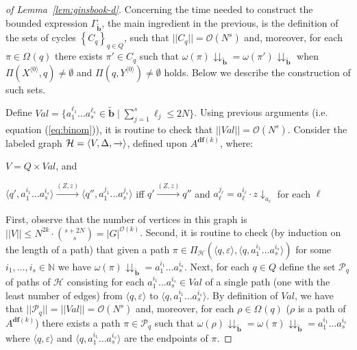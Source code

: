 \documentclass[final]{llncs}
\newcommand{\arrow}[2]{\xrightarrow{{\scriptscriptstyle #1}}}
\def\set#1{{\left\{ #1 \right\}}}
\def\tuple#1{{\langle #1 \rangle}}
\def\nats{{\mathbb{N}}}
\def\card#1{{|\!|{#1}|\!|}}
\def\len#1{{\vert{#1}\vert}}
\def\prod{\Delta}
\def\patt{{\widetilde{\mathbf{b}}}}
\def\pattg{{\Gamma_\patt}}
\def\df#1{\scriptscriptstyle\mathbf{df}(#1)}
\newcommand{\cycles}[2]{\Omega_{{#1}}({#2})}
\def\proj{\mathbin{\downarrow}}
\renewcommand{\proj}[2]{{#1}\mathclose{\downarrow}_{{#2}}}
\newcommand{\projpatt}[1]{{#1}\mathclose{\downdownarrows}_{{\patt}}}
\begin{document}
\begin{proof}[of Lemma~\ref{lem:ginsbook-d}]
Concerning the time needed to construct the bounded
expression \(\pattg\), the main ingredient in the previous, is the
definition of the sets of
cycles \(\set{C_q}_{q\in Q}\), such that $\card{C_q}
= \mathcal{O}(N^s)$ and, moreover, for
each \(\pi\in\cycles{}{q}\) there exists \(\pi' \in C_q\) such that
\(\projpatt{\omega(\pi)}= \projpatt{\omega(\pi')}\)
when
\(\Pi(X^{\tuple{0}},q) \neq \emptyset\) and \(\Pi(q, Y^{\tuple{0}}) \neq \emptyset\) holds.
Below we describe the construction of such sets.

Define \(\mathit{Val} = \{a_1^{\ell_1} \ldots
a_s^{\ell_s} \in \patt \mid \sum_{j=1}^s \ell_{j} \leq 2N\}\).
Using previous arguments (i.e. equation (\ref{eq:binom})), it is routine to
check that \(\card{\mathit{Val}} = \mathcal{O}(N^{s})\). Consider the
labeled graph $\mathcal{H} = \tuple{V, \prod, \arrow{}{}}$, defined upon 
\(A^{\df{k}}\), where:
\begin{compactitem}
\item $V = Q \times \mathit{Val}$, and
\item \(\tuple{q',a_1^{i_1}\ldots a_s^{i_s}} \arrow{(Z,z)}{}
	\tuple{q'', a_1^{j_1}\ldots a_s^{j_s}}\) if{}f \(q' \arrow{(Z,z)}{A^{\df{k}}} q''\) 
        and \(a^{j_{\ell}}_{\ell} = a^{i_\ell}_{\ell}\cdot \proj{z}{a_{\ell}}\) for each \(\ell\)
\end{compactitem}

First, observe that the number of vertices in this graph is \(\card{V}
\leq N^{2k} \cdot \binom{s+2N}{s} = \len{G}^{\mathcal{O}(k)}\). 
Second, it is routine to check (by induction on the length of a path)
 that given a
 path \(\pi \in \Pi_{\mathcal{H}}(\tuple{q,\varepsilon}, \tuple{q,a_1^{i_1}\ldots a_s^{i_s}})\)
 for some \(i_1,\ldots,i_s \in\nats\) we have \( \projpatt{\omega(\pi)} = a_1^{i_1}\ldots a_s^{i_s}\). Next, for
 each \(q\in Q\) define the set \(\mathcal{P}_{q}\)
 of paths of \(\mathcal{H}\) consisting for
 each \(a_1^{i_1}\ldots a_s^{i_s}\in\mathit{Val}\) of a single path (one with the least
 number of edges) from \(\tuple{q,\varepsilon}\) to \(\tuple{q,a_1^{i_1}\ldots a_s^{i_s}}\).
 By definition of \(\mathit{Val}\), we have
 that \(\card{\mathcal{P}_q} = \card{\mathit{Val}}
 = \mathcal{O}(N^s)\) and,
 moreover, for each \(\rho \in \cycles{}{q}\) (\(\rho\) is a path of \(A^{\df{k}}\)) there exists a path 
 \(\pi\in\mathcal{P}_q\) such that \( 
 \projpatt{\omega(\rho)} = \projpatt{\omega(\pi)} = a_1^{i_1} \ldots a_s^{i_s} \)
 where \( \tuple{q,\varepsilon} \) and \( \tuple{q, a_1^{i_1} \ldots a_s^{i_s}} \) are the endpoints of \(\pi\). 


\end{proof}
\end{document}
